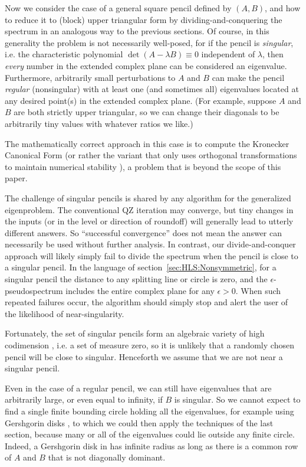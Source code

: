 \documentclass{article}
\theoremstyle{definition}
\begin{document}
Now we consider the case of a general square pencil defined by $(A,B)$, and how to reduce it to (block) upper triangular form by dividing-and-conquering the spectrum in an analogous way to the previous sections.  Of course, in this generality the problem is not necessarily well-posed, for if the pencil is {\em singular}, i.e. the characteristic polynomial $\det(A - \lambda B) \equiv 0$ independent of $\lambda$, then {\em every} number in the extended complex plane can be considered an eigenvalue. Furthermore, arbitrarily small perturbations to $A$ and $B$ can make the pencil {\em regular} (nonsingular) with at least one (and sometimes all) eigenvalues located at any desired point(s) in the extended complex plane. (For example, suppose $A$ and $B$ are both strictly upper triangular, so we can change their diagonals to be arbitrarily tiny values with whatever ratios we like.)

The mathematically correct approach in this case is to compute the Kronecker Canonical Form (or rather the variant that only uses orthogonal transformations to maintain numerical stability \cite{demmelkagstrom93a,demmelkagstrom93b}),  a problem that is beyond the scope of this paper.

The challenge of singular pencils is shared by any algorithm for the  generalized eigenproblem. The conventional QZ iteration may converge, but tiny changes in the inputs (or in the level or direction of roundoff) will generally lead to utterly different answers. So ``successful convergence'' does not mean the answer can necessarily be used without further analysis. In contrast, our divide-and-conquer approach will likely simply fail to divide the spectrum when the pencil is close to a singular pencil. In the language of section~\ref{sec:HLS:Nonsymmetric}, for a singular pencil the distance to any splitting line or circle is zero, and the $\epsilon$-pseudospectrum includes the entire complex plane for any $\epsilon > 0$. When such repeated failures occur, the algorithm should simply stop and alert the user of the likelihood of near-singularity.

Fortunately, the set of singular pencils form an algebraic variety of high codimension \cite{demmeledelman95},  i.e. a set of measure zero, so it is unlikely that a randomly chosen pencil will be close to singular. Henceforth we assume that we are not near a singular pencil.

Even in the case of a regular pencil, we can still have eigenvalues that are arbitrarily large, or even equal to infinity, if $B$ is singular. So we cannot expect to find a single finite bounding circle holding all the eigenvalues, for example using Gershgorin disks \cite{Stewart75}, to which we could then apply the techniques of the last section, because  many or all of the eigenvalues could lie outside any finite circle. Indeed, a Gershgorin disk in \cite{Stewart75} has infinite radius as long as there is a common row of $A$ and $B$ that is not diagonally dominant.
\end{document}

